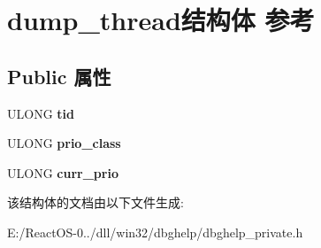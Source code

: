 \hypertarget{structdump__thread}{}\section{dump\+\_\+thread结构体 参考}
\label{structdump__thread}
\subsection*{Public 属性}
\begin{DoxyCompactItemize}
\item 
\mbox{\label{structdump__thread_aa53824c76dc56bd643e3883d9699b53e}} 
U\+L\+O\+NG {\bfseries tid}
\item 
\mbox{\label{structdump__thread_a370366a86ae9caa2b24191dafe485930}} 
U\+L\+O\+NG {\bfseries prio\+\_\+class}
\item 
\mbox{\label{structdump__thread_a885e9dff6c6bcf4b748af9b3c414688b}} 
U\+L\+O\+NG {\bfseries curr\+\_\+prio}
\end{DoxyCompactItemize}


该结构体的文档由以下文件生成\+:\begin{DoxyCompactItemize}
\item 
E\+:/\+React\+O\+S-\/0../dll/win32/dbghelp/dbghelp\+\_\+private.\+h\end{DoxyCompactItemize}
